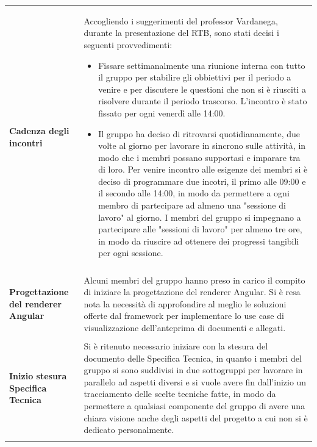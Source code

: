 \documentclass[a4paper,12pt]{article}
\begin{document}
\begin{longtable}{P{5cm}|P{10cm}}
            \textbf{Cadenza degli incontri} & Accogliendo i suggerimenti del professor Vardanega, durante la presentazione
            del RTB, sono stati decisi i seguenti provvedimenti:
            \begin{itemize}
                \item Fissare settimanalmente una riunione interna con tutto il gruppo per stabilire gli obbiettivi per 
                    il periodo a venire e per discutere le questioni che non si è riusciti a risolvere durante il periodo
                    trascorso. L'incontro è stato fissato per ogni venerdì alle 14:00.
                \item Il gruppo ha deciso di ritrovarsi quotidianamente, due volte al giorno per lavorare in sincrono sulle
                    attività, in modo che i membri possano supportasi e imparare tra di loro. Per venire incontro alle 
                    esigenze dei membri si è deciso di programmare due incotri, il primo alle 09:00 e il secondo alle 14:00, in modo da permettere a ogni membro di partecipare ad almeno una "sessione di lavoro" al giorno. 
                    I membri del gruppo si impegnano a partecipare alle "sessioni di lavoro" per almeno tre ore, in modo da riuscire ad ottenere dei progressi tangibili per ogni sessione.
            \end{itemize}\\\\

            \textbf{Progettazione del renderer Angular} & Alcuni membri del gruppo hanno preso in carico il compito di iniziare la progettazione
                        del renderer Angular. Si è resa nota la necessità di approfondire
                        al meglio le soluzioni offerte dal framework per implementare lo use case di visualizzazione dell'anteprima 
                        di documenti e allegati.\\\\
            \textbf{Inizio stesura Specifica Tecnica} & Si è ritenuto necessario iniziare con la stesura del documento
            delle Specifica Tecnica, in quanto i membri del gruppo si sono suddivisi in due sottogruppi per lavorare
            in parallelo ad aspetti diversi e si vuole avere fin dall'inizio un tracciamento delle scelte tecniche fatte, in modo da permettere a qualsiasi componente del gruppo di avere una chiara visione anche degli aspetti del progetto a cui non si è dedicato personalmente.\\\\
        \end{longtable}
\end{document}
